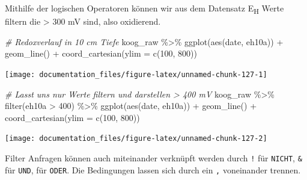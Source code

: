 \documentclass[
]{article}
\newenvironment{Shaded}{\begin{snugshade}}{\end{snugshade}}
\newcommand{\AttributeTok}[1]{\textcolor[rgb]{0.77,0.63,0.00}{#1}}
\newcommand{\CommentTok}[1]{\textcolor[rgb]{0.56,0.35,0.01}{\textit{#1}}}
\newcommand{\DecValTok}[1]{\textcolor[rgb]{0.00,0.00,0.81}{#1}}
\newcommand{\FunctionTok}[1]{\textcolor[rgb]{0.00,0.00,0.00}{#1}}
\newcommand{\NormalTok}[1]{#1}
\newcommand{\SpecialCharTok}[1]{\textcolor[rgb]{0.00,0.00,0.00}{#1}}
\begin{document}
Mithilfe der logischen Operatoren können wir aus dem Datensatz E\textsubscript{H} Werte filtern die \textgreater{} 300 mV sind, also oxidierend.

\begin{Shaded}
\begin{Highlighting}[]
\CommentTok{\# Redoxverlauf in 10 cm Tiefe}
\NormalTok{koog\_raw }\SpecialCharTok{\%\textgreater{}\%}
  \FunctionTok{ggplot}\NormalTok{(}\FunctionTok{aes}\NormalTok{(date, eh10a)) }\SpecialCharTok{+}
  \FunctionTok{geom\_line}\NormalTok{() }\SpecialCharTok{+}
  \FunctionTok{coord\_cartesian}\NormalTok{(}\AttributeTok{ylim =} \FunctionTok{c}\NormalTok{(}\DecValTok{100}\NormalTok{, }\DecValTok{800}\NormalTok{))}
\end{Highlighting}
\end{Shaded}

\begin{center}\texttt{[image: documentation\_files/figure-latex/unnamed-chunk-127-1]} \end{center}

\begin{Shaded}
\begin{Highlighting}[]
\CommentTok{\# Lasst uns nur Werte filtern und darstellen \textgreater{} 400 mV}
\NormalTok{koog\_raw }\SpecialCharTok{\%\textgreater{}\%}
  \FunctionTok{filter}\NormalTok{(eh10a }\SpecialCharTok{\textgreater{}} \DecValTok{400}\NormalTok{) }\SpecialCharTok{\%\textgreater{}\%}
  \FunctionTok{ggplot}\NormalTok{(}\FunctionTok{aes}\NormalTok{(date, eh10a)) }\SpecialCharTok{+}
  \FunctionTok{geom\_line}\NormalTok{() }\SpecialCharTok{+}
  \FunctionTok{coord\_cartesian}\NormalTok{(}\AttributeTok{ylim =} \FunctionTok{c}\NormalTok{(}\DecValTok{100}\NormalTok{, }\DecValTok{800}\NormalTok{))}
\end{Highlighting}
\end{Shaded}

\begin{center}\texttt{[image: documentation\_files/figure-latex/unnamed-chunk-127-2]} \end{center}

Filter Anfragen können auch miteinander verknüpft werden durch \texttt{!} für \texttt{NICHT}, \texttt{\&} für \texttt{UND}, \texttt{\textbar{}} für \texttt{ODER}. Die Bedingungen lassen sich durch ein \texttt{,} voneinander trennen.
\end{document}
